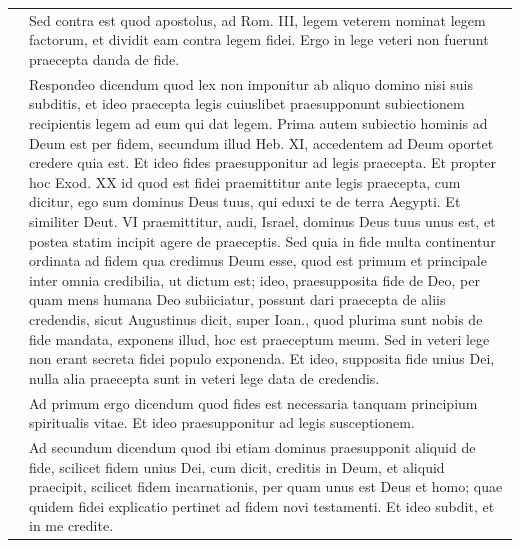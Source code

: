 \documentclass[paper=a4paper,fontsize=10pt,jafontsize=9pt,titlepage]{jlreq}
\begin{document}
\begin{longtable}{p{21em}p{21em}}
\\

&



Sed contra est quod apostolus, ad
Rom. III, legem veterem nominat legem factorum, et dividit eam contra
legem fidei. Ergo in lege veteri non fuerunt praecepta danda de fide.


\\

&



Respondeo dicendum quod lex non
imponitur ab aliquo domino nisi suis subditis, et ideo praecepta legis
cuiuslibet praesupponunt subiectionem recipientis legem ad eum qui dat
legem. Prima autem subiectio hominis ad Deum est per fidem, secundum
illud Heb. XI, accedentem ad Deum oportet credere quia est. Et ideo
fides praesupponitur ad legis praecepta. Et propter hoc Exod. XX id quod
est fidei praemittitur ante legis praecepta, cum dicitur, ego sum
dominus Deus tuus, qui eduxi te de terra Aegypti. Et similiter Deut. VI
praemittitur, audi, Israel, dominus Deus tuus unus est, et postea statim
incipit agere de praeceptis. Sed quia in fide multa continentur ordinata
ad fidem qua credimus Deum esse, quod est primum et principale inter
omnia credibilia, ut dictum est; ideo, praesupposita fide de Deo, per
quam mens humana Deo subiiciatur, possunt dari praecepta de aliis
credendis, sicut Augustinus dicit, super Ioan., quod plurima sunt nobis
de fide mandata, exponens illud, hoc est praeceptum meum. Sed in veteri
lege non erant secreta fidei populo exponenda. Et ideo, supposita fide
unius Dei, nulla alia praecepta sunt in veteri lege data de credendis.


\\

&



Ad primum ergo dicendum quod fides est
necessaria tanquam principium spiritualis vitae. Et ideo praesupponitur
ad legis susceptionem.


\\

&



Ad secundum dicendum quod ibi etiam
dominus praesupponit aliquid de fide, scilicet fidem unius Dei, cum
dicit, creditis in Deum, et aliquid praecipit, scilicet fidem
incarnationis, per quam unus est Deus et homo; quae quidem fidei
explicatio pertinet ad fidem novi testamenti. Et ideo subdit, et in me
credite.



\end{longtable}
\end{document}
